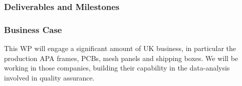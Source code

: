 \subsubsection{Deliverables and Milestones}


\subsubsection{Business Case}

This WP will engage a significant amount of UK business, in particular the production APA frames, PCBs, mesh panels and shipping boxes. We will be working in those companies, building their capability in the data-analysis involved in quality assurance.